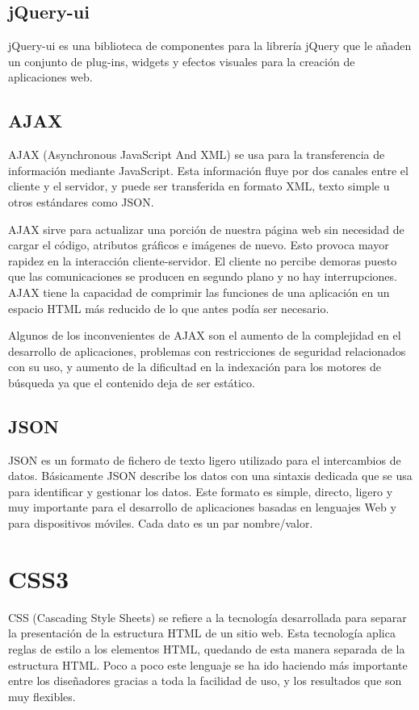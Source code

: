\documentclass[a4paper, 12pt]{book}
\begin{document}
\subsection{jQuery-ui}
\label{subsec:jqueryui}
jQuery-ui es una biblioteca de componentes para la librer\'ia jQuery que le a\~naden un conjunto de plug-ins, widgets y efectos visuales para la 
creaci\'on de aplicaciones web.


\subsection{AJAX}
\label{subsec:ajax}
AJAX (Asynchronous JavaScript And XML) se usa para la transferencia de informaci\'on mediante JavaScript. Esta informaci\'on fluye por dos canales 
entre el cliente y el servidor, y puede ser transferida en formato XML, texto simple u otros est\'andares como JSON.

AJAX sirve para actualizar una porci\'on de nuestra p\'agina web sin necesidad de cargar el c\'odigo, atributos gr\'aficos e im\'agenes de nuevo. Esto
provoca mayor rapidez en la interacci\'on cliente-servidor. El cliente no percibe demoras puesto que las comunicaciones se producen en segundo plano y
no hay interrupciones. AJAX tiene la capacidad de comprimir las funciones de una aplicaci\'on en un espacio HTML m\'as reducido de lo que antes pod\'ia
ser necesario.

Algunos de los inconvenientes de AJAX son el aumento de la complejidad en el desarrollo de aplicaciones, problemas con restricciones de seguridad 
relacionados con su uso, y aumento de la dificultad en la indexaci\'on para los motores de b\'usqueda ya que el contenido deja de ser est\'atico.


\subsection{JSON}
\label{subsec:json}
JSON es un formato de fichero de texto ligero utilizado para el intercambios de datos. B\'asicamente JSON describe los datos con una sintaxis dedicada 
que se usa para identificar y gestionar los datos. Este formato es simple, directo, ligero y muy importante para el desarrollo de aplicaciones basadas 
en lenguajes Web y para dispositivos m\'oviles. Cada dato es un par nombre/valor.


\section{CSS3}
\label{sec:css3}
CSS (Cascading Style Sheets) se refiere a la tecnolog\'ia desarrollada para separar la presentaci\'on de la estructura HTML de un sitio web. 
Esta tecnolog\'ia aplica reglas de estilo a los elementos HTML, quedando de esta manera separada de la estructura HTML. Poco a poco este lenguaje se 
ha ido haciendo m\'as importante entre los dise\~nadores gracias a toda la facilidad de uso, y los resultados que son muy flexibles.
\end{document}
